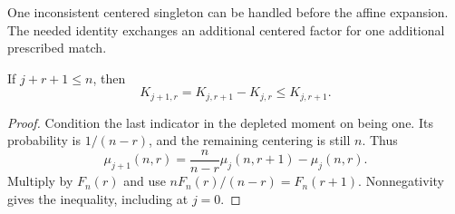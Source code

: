 One inconsistent centered singleton can be handled before the affine expansion. The needed identity exchanges an additional centered factor for one additional prescribed match.

\begin{lemma}\label{lem:kerneldifference}
If $j+r+1\le n$, then
\[
K_{j+1,r}=K_{j,r+1}-K_{j,r}\le K_{j,r+1}.
\]
\end{lemma}
\begin{proof}
Condition the last indicator in the depleted moment on being one. Its probability is $1/(n-r)$, and the remaining centering is still $n$. Thus
\[
\mu_{j+1}(n,r)=\frac n{n-r}\mu_j(n,r+1)-\mu_j(n,r).
\]
Multiply by $F_n(r)$ and use $nF_n(r)/(n-r)=F_n(r+1)$. Nonnegativity gives the inequality, including at $j=0$.
\end{proof}

